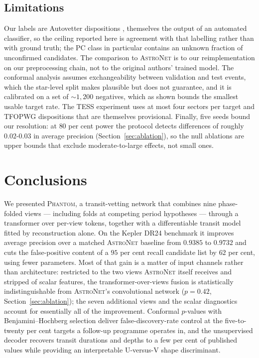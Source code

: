 \documentclass[preprint,12pt,authoryear]{elsarticle}
\newcommand{\phantomnet}{\textsc{Phantom}}
\newcommand{\astronet}{\textsc{AstroNet}}
\begin{document}
\subsection{Limitations}

Our labels are Autovetter dispositions \citep{McCauliff2015}, themselves the
output of an automated classifier, so the ceiling reported here is agreement
with that labelling rather than with ground truth; the PC class in particular
contains an unknown fraction of unconfirmed candidates. The comparison to
\astronet{} is to our reimplementation on our preprocessing chain, not to the
original authors' trained model. The conformal analysis assumes exchangeability
between validation and test events, which the star-level split makes plausible
but does not guarantee, and it is calibrated on a set of $\sim$$1{,}200$
negatives, which as shown bounds the smallest usable target rate. The TESS
experiment uses at most four sectors per target and TFOPWG dispositions that are
themselves provisional. Finally, five seeds bound our resolution: at $80$ per
cent power the protocol detects differences of roughly $0.02$-$0.03$ in average
precision (Section~\ref{sec:ablation}), so the null ablations are upper bounds
that exclude moderate-to-large effects, not small ones.

\section{Conclusions}
\label{sec:conclusions}

We presented \phantomnet{}, a transit-vetting network that combines nine
phase-folded views --- including folds at competing period hypotheses --- through
a transformer over per-view tokens, together with a differentiable transit model
fitted by reconstruction alone. On the Kepler DR24 benchmark it improves average
precision over a matched \astronet{} baseline from $0.9385$ to $0.9732$ and cuts
the false-positive content of a $95$ per cent recall candidate list by $62$ per
cent, using fewer parameters. Most of that gain is a matter of input channels
rather than architecture: restricted to the two views \astronet{} itself
receives and stripped of scalar features, the transformer-over-views fusion is
statistically indistinguishable from \astronet{}'s convolutional network
($p = 0.42$, Section~\ref{sec:ablation}); the seven additional views and the
scalar diagnostics account for essentially all of the improvement. Conformal
$p$-values with Benjamini--Hochberg
selection deliver false-discovery-rate control at the five-to-twenty per cent
targets a follow-up programme operates in, and the unsupervised decoder recovers
transit durations and depths to a few per cent of published values while
providing an interpretable U-versus-V shape discriminant.
\end{document}
